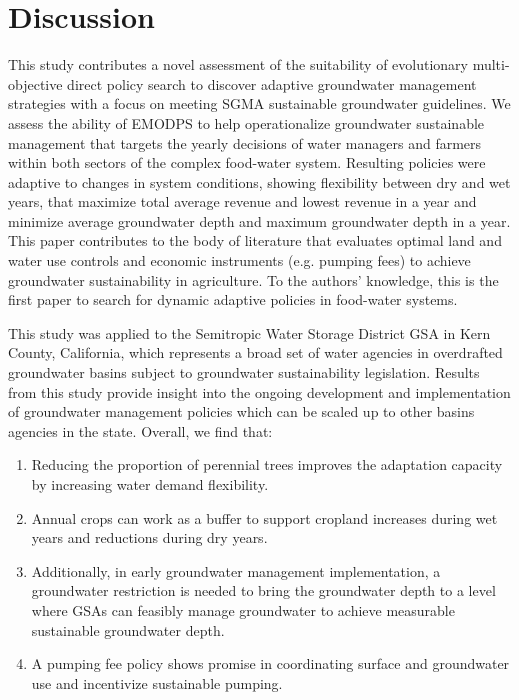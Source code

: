 \documentclass[11pt,a4paper]{article}
\begin{document}
\section{Discussion}

This study contributes a novel assessment of the suitability of evolutionary multi-objective direct policy search to discover adaptive groundwater management strategies with a focus on meeting SGMA sustainable groundwater guidelines. We assess the ability of EMODPS to help operationalize groundwater sustainable management that targets the yearly decisions of water managers and farmers within both sectors of the complex food-water system. Resulting policies were adaptive to changes in system conditions, showing flexibility between dry and wet years, that maximize total average revenue and lowest revenue in a year and minimize average groundwater depth and maximum groundwater depth in a year. This paper contributes to the body of literature that evaluates optimal land and water use controls and economic instruments (e.g. pumping fees) to achieve groundwater sustainability in agriculture. To the authors’ knowledge, this is the first paper to search for dynamic adaptive policies in food-water systems.  

This study was applied to the Semitropic Water Storage District GSA in Kern County, California, which represents a broad set of water agencies in overdrafted groundwater basins subject to groundwater sustainability legislation. Results from this study provide insight into the ongoing development and implementation of groundwater management policies which can be scaled up to other basins agencies in the state. Overall, we find that:  

\begin{enumerate}
    \item   Reducing the proportion of perennial trees improves the adaptation capacity by increasing water demand flexibility.  
    \item  Annual crops can work as a buffer to support cropland increases during wet years and reductions during dry years.
    \item  Additionally, in early groundwater management implementation, a groundwater restriction is needed to bring the groundwater depth to a level where GSAs can feasibly manage groundwater to achieve measurable sustainable groundwater depth.
    \item  A pumping fee policy shows promise in coordinating surface and groundwater use and incentivize sustainable pumping. 
\end{enumerate}
\end{document}
